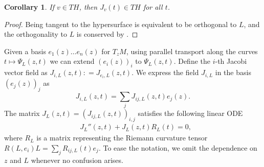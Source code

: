 \documentclass[12pt,a4paper]{amsart}
\theoremstyle{plain}
\newtheorem{corollary}[lemma]{Corollary}
\theoremstyle{definition}
\numberwithin{equation}{section}
\newcommand{\gflow}{\Psi}
\begin{document}
\begin{corollary}
  If $v\in TH$, then $J_v(t)\in TH$ for all $t$.
\end{corollary}
\begin{proof}
  Being tangent to the hypersurface is equivalent to be orthogonal to
  $L$, and the orthogonality to $L$ is conserved by .
\end{proof}


Given a basis  $e_1(z)\dots e_{n}(z)$  for $T_zM$,
using parallel transport along the curves $t \mapsto \gflow_L(z,t)$ we can extend $(e_i(z))_i$ to $\gflow_L(z,t)$.
%
Define the $i$-th Jacobi vector field as $J_{i,L}(z,t) : =J_{e_i,L}(z,t)$.
%
We express the field $J_{i,L}$ in the basis $(e_{j}(z))_{j}$ as
\begin{equation}\label{eq:defJL}
  J_{i,L}(z,t)
  =
  \sum_j
  J_{ij,L}(z,t) e_j(z).
\end{equation}
%
The matrix $J_L(z,t) = (J_{ij,L}(z,t))_{i,j}$ satisfies the following linear ODE
\begin{align}
  &
    J_{L}''(z,t)
    +J_{L}(z,t) R_L(t)=0
    ,
\end{align}
where $R_L$ is a matrix representing the Riemann curvature tensor
$R(L,e_i)L =\sum_{j} R_{ij,L}(t) e_j $.
To ease the notation, we omit the dependence on $z$ and $L$ whenever  no confusion arises.
\end{document}
